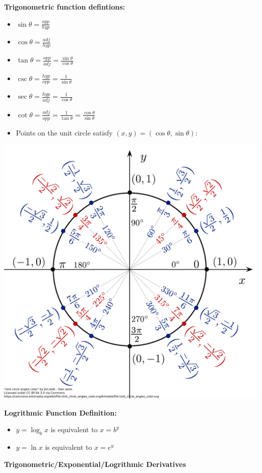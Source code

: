 \documentclass[12pt]{exam}
\newcommand{\<}{\langle}
\renewcommand{\>}{\rangle}
\begin{document}
\noindent
\textbf{Trigonometric function defintions:}
\begin{itemize}
  \item \(\sin\theta = \frac{opp}{hyp}\)
  \item \(\cos\theta = \frac{adj}{hyp}\)
  \item \(\tan\theta = \frac{opp}{adj}=\frac{\sin\theta}{\cos\theta}\)
  \item \(\csc\theta = \frac{hyp}{opp}=\frac{1}{\sin\theta}\)
  \item \(\sec\theta = \frac{hyp}{adj}=\frac{1}{\cos\theta}\)
  \item \(\cot\theta =
    \frac{adj}{opp}=\frac{1}{\tan\theta}=\frac{\cos\theta}{\sin\theta}\)
  \item
Points on the unit circle satisfy \((x,y)=(\cos\theta,\sin\theta)\):
\end{itemize}
\begin{center}
\includegraphics[width=0.7\linewidth]{../unit-circle.pdf}
\end{center}

\noindent
\textbf{Logrithmic Function Definition:}
\begin{itemize}
  \item \(y=\log_b x\) is equivalent to \(x=b^y\)
  \item \(y=\ln x\) is equivalent to \(x=e^y\)
\end{itemize}

\newpage

\noindent
\textbf{Trigonometric/Exponential/Logrithmic Derivatives}
\end{document}
